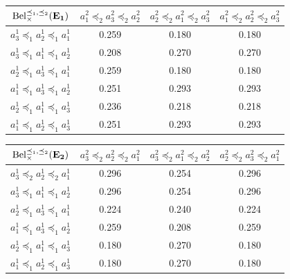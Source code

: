 \begin{example}
\begin{center}
\begin{tabular}{|c||c|c|c|}
\hline
$\mathrm{Bel}^{\preceq_1,\preceq_2}_\times(\mathbf{E_1})$ & $a^2_1\preceq_2a^2_3\preceq_2a^2_2$ & $a^2_2\preceq_2a^2_1\preceq_2a^2_3$ & $a^2_1\preceq_2a^2_2\preceq_2a^2_3$ \\ \hline\hline
$a^1_3\preceq_1a^1_2\preceq_1a^1_1$ & 0.259 & 0.180 & 0.180 \\ \hline
$a^1_3\preceq_1a^1_1\preceq_1a^1_2$ & 0.208 & 0.270 & 0.270 \\ \hline
$a^1_2\preceq_1a^1_3\preceq_1a^1_1$ & 0.259 & 0.180 & 0.180 \\ \hline
$a^1_1\preceq_1a^1_3\preceq_1a^1_2$ & 0.251 & 0.293 & 0.293 \\ \hline
$a^1_2\preceq_1a^1_1\preceq_1a^1_3$ & 0.236 & 0.218 & 0.218 \\ \hline
$a^1_1\preceq_1a^1_2\preceq_1a^1_3$ & 0.251 & 0.293 & 0.293 \\ \hline
\end{tabular}

\vspace{1cm}

\begin{tabular}{|c||c|c|c|}
\hline
$\mathrm{Bel}^{\preceq_1,\preceq_2}_\times(\mathbf{E_2})$ & $a^2_3\preceq_2a^2_2\preceq_2a^2_1$ & $a^2_3\preceq_2a^2_1\preceq_2a^2_2$ & $a^2_2\preceq_2a^2_3\preceq_2a^2_1$ \\ \hline\hline
$a^1_3\preceq_2a^1_2\preceq_2a^1_1$ & 0.296 & 0.254 & 0.296 \\ \hline
$a^1_3\preceq_1a^1_1\preceq_1a^1_2$ & 0.296 & 0.254 & 0.296 \\ \hline
$a^1_2\preceq_1a^1_3\preceq_1a^1_1$ & 0.224 & 0.240 & 0.224 \\ \hline
$a^1_1\preceq_1a^1_3\preceq_1a^1_2$ & 0.259 & 0.208 & 0.259 \\ \hline
$a^1_2\preceq_1a^1_1\preceq_1a^1_3$ & 0.180 & 0.270 & 0.180 \\ \hline
$a^1_1\preceq_1a^1_2\preceq_1a^1_3$ & 0.180 & 0.270 & 0.180 \\ \hline
\end{tabular}

\vspace{0.5cm}


\end{center}
\end{example}
